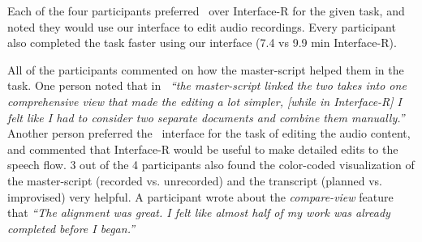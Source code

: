 Each of the four participants preferred \systemname\ over Interface-R for the given task, and noted they would use
our interface to edit audio recordings. Every participant also
completed the task faster using our interface (7.4 vs 9.9 min Interface-R). 


All of the participants commented on how the master-script helped them in the task. One person noted that in \systemname\ \textit{``the master-script linked the two takes into one comprehensive view
that made the editing a lot simpler, [while in Interface-R] I felt like I had to consider two separate documents and combine them manually.''} Another person preferred the \systemname\ interface for the task of editing the audio content, and commented that Interface-R would be useful to make detailed edits to the speech flow. 3 out of the 4 participants also found the color-coded visualization of the master-script (recorded vs. unrecorded) and the transcript (planned vs. improvised) very helpful. A participant wrote about the \textit{compare-view} feature that \textit{``The alignment was great. I felt like almost half of my work was
already completed before I began.''} 


